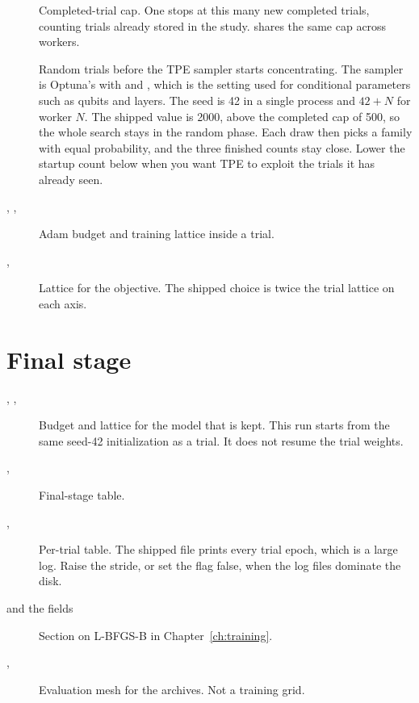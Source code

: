 \begin{description}
\item[]
Completed-trial cap.
One  stops at this many new completed trials, counting trials already stored in the study.
 shares the same cap across workers.

\item[]
Random trials before the TPE sampler starts concentrating.
The sampler is Optuna's  with  and , which is the setting used for conditional parameters such as qubits and layers.
The seed is 42 in a single process and \(42+N\) for worker \(N\).
The shipped value is 2000, above the completed cap of 500, so the whole search stays in the random phase.
Each draw then picks a family with equal probability, and the three finished counts stay close.
Lower the startup count below  when you want TPE to exploit the trials it has already seen.

\item[, , ]
Adam budget and training lattice inside a trial.

\item[, ]
Lattice for the objective. The shipped choice is twice the trial lattice on each axis.
\end{description}

\section{Final stage}

\begin{description}
\item[, , ]
Budget and lattice for the model that is kept.
This run starts from the same seed-42 initialization as a trial.
It does not resume the trial weights.

\item[, ]
Final-stage table.

\item[, ]
Per-trial table.
The shipped file prints every trial epoch, which is a large log.
Raise the stride, or set the flag false, when the log files dominate the disk.

\item[ and the  fields]
Section on L-BFGS-B in Chapter~\ref{ch:training}.

\item[, ]
Evaluation mesh for the archives. Not a training grid.
\end{description}


